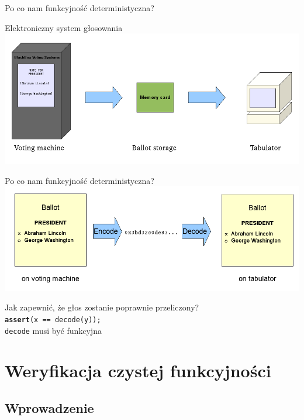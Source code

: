 \documentclass{beamer}
\begin{document}
\begin{frame}{Po co nam funkcyjność deterministyczna?}
  \begin{center}
    Elektroniczny system głosowania
  \includegraphics[width=\columnwidth]{img/voting-1.png}
  \end{center}
\end{frame}

\begin{frame}{Po co nam funkcyjność deterministyczna?}
  \includegraphics[width=\columnwidth]{img/voting-2.png}
  \begin{center}
  \pause
  Jak zapewnić, że głos zostanie poprawnie przeliczony? \\
  \pause
  \texttt{\textbf{assert}(x == decode(y));} \\
  \pause
  \alert{\texttt{decode} musi być funkcyjna}
  \end{center}
\end{frame}

\section{Weryfikacja czystej funkcyjności}

\subsection{Wprowadzenie}
\end{document}
